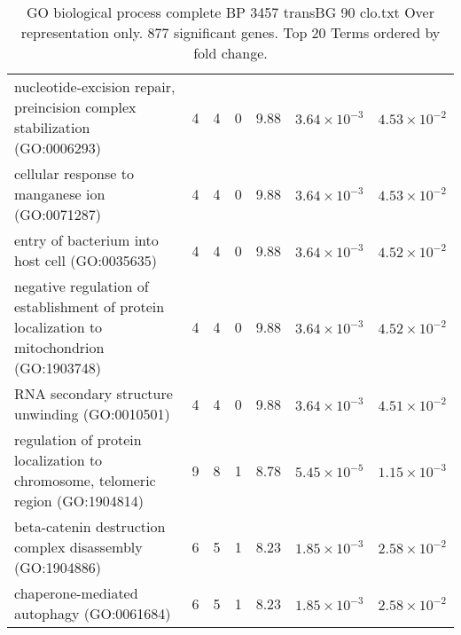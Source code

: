 \begin{table}[ht]
\begin{adjustbox}{width=\textwidth}
\begin{tabular}{lrrrlrr}
  nucleotide-excision repair, preincision complex stabilization (GO:0006293) & 4 & 4 & 0 & 9.88 & $3.64 \times 10^{-3}$ & $4.53 \times 10^{-2}$ \\  
  cellular response to manganese ion (GO:0071287) & 4 & 4 & 0 & 9.88 & $3.64 \times 10^{-3}$ & $4.53 \times 10^{-2}$ \\ 
  entry of bacterium into host cell (GO:0035635) & 4 & 4 & 0 & 9.88 & $3.64 \times 10^{-3}$ & $4.52 \times 10^{-2}$ \\ 
  negative regulation of establishment of protein localization to mitochondrion (GO:1903748) & 4 & 4 & 0 & 9.88 & $3.64 \times 10^{-3}$ & $4.52 \times 10^{-2}$ \\ 
  RNA secondary structure unwinding (GO:0010501) & 4 & 4 & 0 & 9.88 & $3.64 \times 10^{-3}$ & $4.51 \times 10^{-2}$ \\ 
  regulation of protein localization to chromosome, telomeric region (GO:1904814) & 9 & 8 & 1 & 8.78 & $5.45 \times 10^{-5}$ & $1.15 \times 10^{-3}$ \\ 
  beta-catenin destruction complex disassembly (GO:1904886) & 6 & 5 & 1 & 8.23 & $1.85 \times 10^{-3}$ & $2.58 \times 10^{-2}$ \\ 
  chaperone-mediated autophagy (GO:0061684) & 6 & 5 & 1 & 8.23 & $1.85 \times 10^{-3}$ & $2.58 \times 10^{-2}$ \\ 
   \hline
\end{tabular}
\end{adjustbox}
\caption{GO biological process complete BP 3457 transBG 90 clo.txt Over representation only. 877 significant genes. Top 20 Terms ordered by fold change. } 
\label{tab:GO biological process complete BP 3457 transBG 90 clo.txt Over representation only. 877 significant genes. Top 20 Terms ordered by fold change. }
\end{table}



